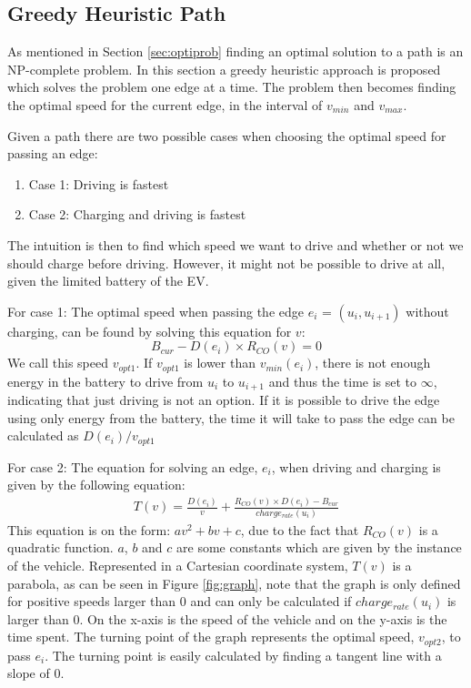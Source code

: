 \subsection{Greedy Heuristic Path}\label{sec:greedy}
As mentioned in Section \ref{sec:optiprob} finding an optimal solution to a path is an NP-complete problem. In this section a greedy heuristic approach is proposed which solves the problem one edge at a time. The problem then becomes finding the optimal speed for the current edge, in the interval of $v_{min}$ and $v_{max}$.

Given a path there are two possible cases when choosing the optimal speed for passing an edge:
\begin{enumerate}
	\item Case 1: Driving is fastest
	\item Case 2: Charging and driving is fastest
\end{enumerate}
The intuition is then to find which speed we want to drive and whether or not we should charge before driving. However, it might not be possible to drive at all, given the limited battery of the EV. 

For case 1: The optimal speed when passing the edge $e_i$ = $(u_i, u_{i+1})$ without charging, can be found by solving this equation for $v$:
\[B_{cur} - D(e_i) \times R_{CO}(v) = 0\] 
We call this speed $v_{opt1}$. If $v_{opt1}$ is lower than $v_{min}(e_i)$, there is not enough energy in the battery to drive from $u_i$ to $u_{i+1}$ and thus the time is set to $\infty$, indicating that just driving is not an option. If it is possible to drive the edge using only energy from the battery, the time it will take to pass the edge can be calculated as $D(e_i) / v_{opt1}$

For case 2: The equation for solving an edge, $e_i$, when driving and charging is given by the following equation: 
\begin{equation*}
\begin{aligned}
T(v) = \frac{D(e_i)}{v} + \frac{R_{CO}(v) \times D(e_i) - B_{cur}}{charge_{rate}(u_{i})}
\end{aligned}
\end{equation*}
This equation is on the form: $av^2 + bv + c$, due to the fact that $R_{CO}(v)$ is a quadratic function. $a$, $b$ and $c$ are some constants which are given by the instance of the vehicle. Represented in a Cartesian coordinate system, $T(v)$ is a parabola, as can be seen in Figure \ref{fig:graph}, note that the graph is only defined for positive speeds larger than $0$ and can only be calculated if $charge_{rate}(u_{i})$ is larger than $0$. On the x-axis is the speed of the vehicle and on the y-axis is the time spent. The turning point of the graph represents the optimal speed, $v_{opt2}$, to pass $e_i$. The turning point is easily calculated by finding a tangent line with a slope of $0$.  

